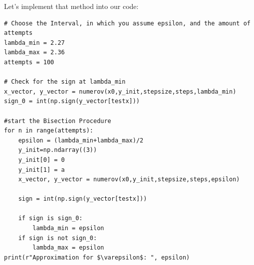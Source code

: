 \documentclass{article}
\begin{document}
Let's implement that method into our code:

\begin{lstlisting}
# Choose the Interval, in which you assume epsilon, and the amount of attempts
lambda_min = 2.27
lambda_max = 2.36
attempts = 100

# Check for the sign at lambda_min
x_vector, y_vector = numerov(x0,y_init,stepsize,steps,lambda_min)
sign_0 = int(np.sign(y_vector[testx]))

#start the Bisection Procedure
for n in range(attempts):     
    epsilon = (lambda_min+lambda_max)/2
    y_init=np.ndarray((3))
    y_init[0] = 0
    y_init[1] = a
    x_vector, y_vector = numerov(x0,y_init,stepsize,steps,epsilon)
    
    sign = int(np.sign(y_vector[testx]))
    
    if sign is sign_0:
        lambda_min = epsilon
    if sign is not sign_0:
        lambda_max = epsilon
print(r"Approximation for $\varepsilon$: ", epsilon) 
\end{lstlisting}
\end{document}
